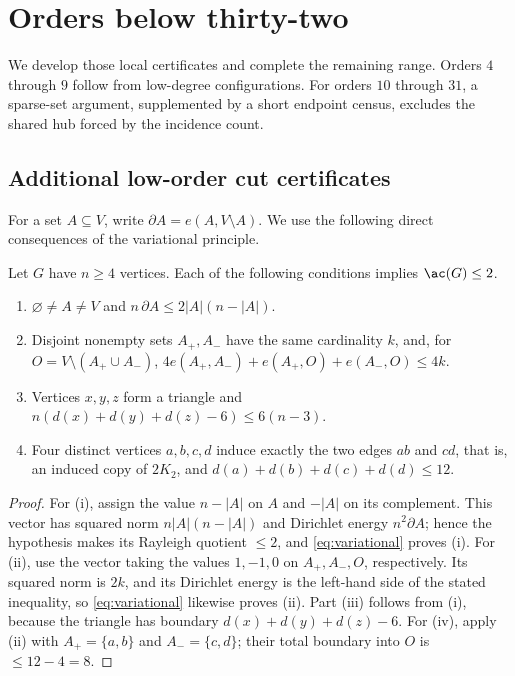 \section{Orders below thirty-two}
\label{sec:orders-below-thirty-two}

We develop those local certificates and complete the remaining range.
Orders \(4\) through \(9\) follow from low-degree configurations.  For orders
\(10\) through \(31\), a sparse-set argument, supplemented by a short endpoint
census, excludes the shared hub forced by the incidence count.

\subsection{Additional low-order cut certificates}

For a set \(A\subseteq V\), write
\(\partial A=e(A,V\setminus A)\).  We use the following direct
consequences of the variational principle.

\begin{proposition}\label{lem:cut-certificates}
Let \(G\) have \(n\ge4\) vertices.  Each of the following conditions implies
\(\ac(G)\le2\).
\begin{enumerate}[label=\textup{(\roman*)}]
  \item \(\varnothing\ne A\ne V\) and
  \(n\,\partial A\le2|A|(n-|A|)\).
  \item Disjoint nonempty sets \(A_+,A_-\) have the same cardinality \(k\),
  and, for \(O=V\setminus(A_+\cup A_-)\),
  \(4e(A_+,A_-)+e(A_+,O)+e(A_-,O)\le4k\).
  \item Vertices \(x,y,z\) form a triangle and
  \(n(d(x)+d(y)+d(z)-6)\le6(n-3)\).
  \item Four distinct vertices \(a,b,c,d\) induce exactly the two edges
  \(ab\) and \(cd\), that is, an induced copy of \(2K_2\), and
  \(d(a)+d(b)+d(c)+d(d)\le12\).
\end{enumerate}
\end{proposition}

\begin{proof}
For (i), assign the value \(n-|A|\) on \(A\) and \(-|A|\) on its
complement.  This vector has squared norm \(n|A|(n-|A|)\) and Dirichlet
energy \(n^2\partial A\); hence the hypothesis makes its Rayleigh quotient
\(\le2\), and \eqref{eq:variational} proves (i).  For (ii), use the vector
taking the values \(1,-1,0\) on \(A_+,A_-,O\), respectively.  Its squared
norm is \(2k\), and its Dirichlet energy is the left-hand side of the stated
inequality, so \eqref{eq:variational} likewise proves (ii).  Part (iii)
follows from (i), because the triangle has boundary
\(d(x)+d(y)+d(z)-6\).  For (iv), apply (ii) with \(A_+=\{a,b\}\) and
\(A_-=\{c,d\}\); their total boundary into \(O\) is \(\le12-4=8\).
\end{proof}

